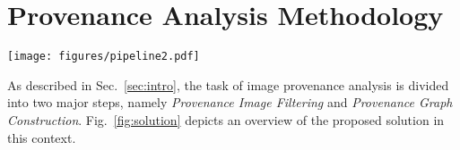 \section{Provenance Analysis Methodology}
\label{sec:prop}

\begin{figure*}[!htbp]
\centering
\texttt{[image: figures/pipeline2.pdf]}
\caption{Proposed pipeline for end-to-end provenance analysis.
The sequence of activities is divided into two parts, which address the tasks of \emph{image filtering} (left panel) and of \emph{graph construction} (right panel).
IVFADC stands for \emph{Inverted File System with Asymmetric Distance Computation}.
RCMM stands for \emph{Reciprocal Condition Matching Measure}.
The value of $n$, within IVFADC, is the number of images in the database.
The value of $k$ is a parameter of the solution and is related to the size of the RCMM rank used for building the provenance graph.
$^\ast$Reported values are merely illustrative.
}
\label{fig:solution}
\end{figure*}

As described in Sec.~\ref{sec:intro}, the task of image provenance analysis is divided into two major steps, namely \emph{Provenance Image Filtering} and \emph{Provenance Graph Construction}.
Fig.~\ref{fig:solution} depicts an overview of the proposed solution in this context.


